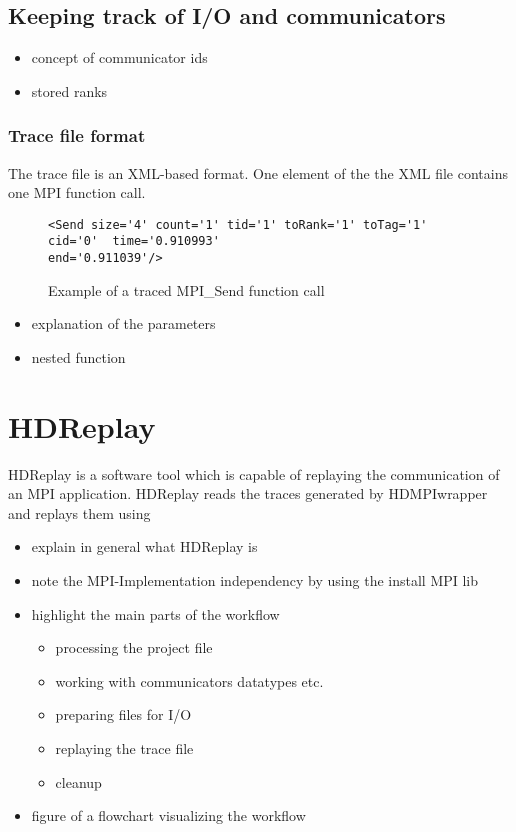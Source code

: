 \subsection{Keeping track of I/O and communicators}

\begin{itemize}
  \item concept of communicator ids 
  \item stored ranks 
\end{itemize}

\subsubsection{Trace file format}
The trace file is an XML-based format. One element of the the XML file contains
one MPI function call.

\begin{figure*}

\begin{lstlisting}
<Send size='4' count='1' tid='1' toRank='1' toTag='1' cid='0'  time='0.910993'
end='0.911039'/>
\end{lstlisting}

\caption{Example of a traced MPI\_Send function call}
\label{fig:trace-example}       %
\end{figure*}

\begin{itemize}
  \item explanation of the parameters
  \item nested function
\end{itemize}



\section{HDReplay}
\label{intro-hdreplay}

HDReplay is a software tool which is capable of replaying the communication of an
MPI application. HDReplay reads the traces generated by HDMPIwrapper and replays
them using

\begin{itemize}
  \item explain in general what HDReplay is 
  \item note the MPI-Implementation independency by using the install MPI lib
  \item highlight the main parts of the workflow
  
  \begin{itemize}
    \item processing the project file
    \item working with communicators datatypes etc.
    \item preparing files for I/O
    \item replaying the trace file
    \item cleanup
  \end{itemize}
  
  \item figure of a flowchart visualizing the workflow
\end{itemize}


